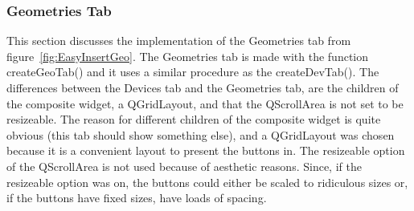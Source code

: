 \subsubsection{Geometries Tab}
\label{sec:GeoTab}

This section discusses the implementation of the Geometries tab from figure~\ref{fig:EasyInsertGeo}. The Geometries tab is made with the function createGeoTab() and it uses a similar procedure as the createDevTab(). The differences between the Devices tab and the Geometries tab, are the children of the composite widget, a QGridLayout, and that the QScrollArea is not set to be resizeable. The reason for different children of the composite widget is quite obvious (this tab should show something else), and a QGridLayout was chosen because it is a convenient layout to present the buttons in. The resizeable option of the QScrollArea is not used because of aesthetic reasons. Since, if the resizeable option was on, the buttons could either be scaled to ridiculous sizes or, if the buttons have fixed sizes, have loads of spacing. 

